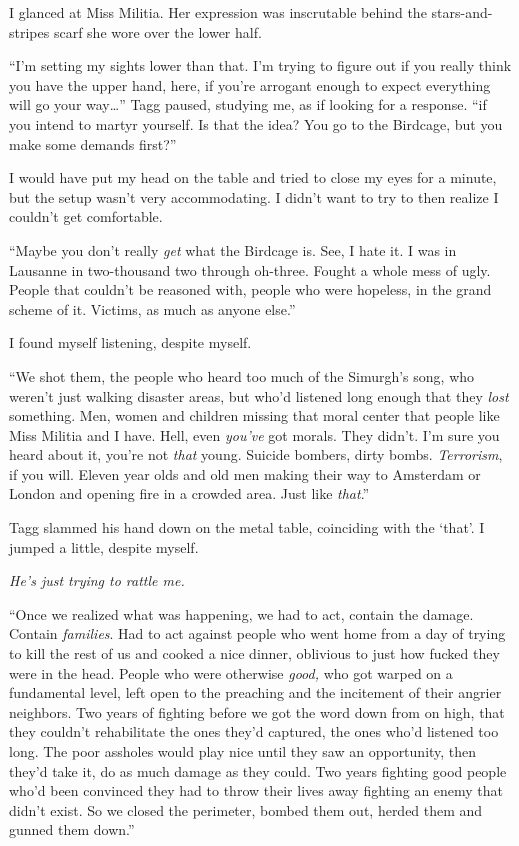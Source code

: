 I glanced at Miss Militia.  Her expression was inscrutable behind the stars-and-stripes scarf she wore over the lower half.



``I'm setting my sights lower than that.  I'm trying to figure out if you really think you have the upper hand, here, if you're arrogant enough to expect everything will go your way\ldots'' Tagg paused, studying me, as if looking for a response.  ``\ldotsor if you intend to martyr yourself.  Is that the idea?  You go to the Birdcage, but you make some demands first?''



I would have put my head on the table and tried to close my eyes for a minute, but the setup wasn't very accommodating.  I didn't want to try to then realize I couldn't get comfortable.



``Maybe you don't really \emph{get} what the Birdcage is.  See, I hate it.  I was in Lausanne in two-thousand two through oh-three.  Fought a whole mess of ugly.  People that couldn't be reasoned with, people who were hopeless, in the grand scheme of it.  Victims, as much as anyone else.''



I found myself listening, despite myself.



``We shot them, the people who heard too much of the Simurgh's song, who weren't just walking disaster areas, but who'd listened long enough that they \emph{lost} something.  Men, women and children missing that moral center that people like Miss Militia and I have.  Hell, even \emph{you've} got morals.  They didn't.  I'm sure you heard about it, you're not \emph{that} young.  Suicide bombers, dirty bombs.  \emph{Terrorism}, if you will.  Eleven year olds and old men making their way to Amsterdam or London and opening fire in a crowded area.  Just like \emph{that}.''



Tagg slammed his hand down on the metal table, coinciding with the `that'.  I jumped a little, despite myself.



\emph{He's just trying to rattle me.}



``Once we realized what was happening, we had to act, contain the damage.  Contain \emph{families}.  Had to act against people who went home from a day of trying to kill the rest of us and cooked a nice dinner, oblivious to just how fucked they were in the head.  People who were otherwise \emph{good, }who got warped on a fundamental level, left open to the preaching and the incitement of their angrier neighbors.  Two years of fighting before we got the word down from on high, that they couldn't rehabilitate the ones they'd captured, the ones who'd listened too long.  The poor assholes would play nice until they saw an opportunity, then they'd take it, do as much damage as they could.  Two years fighting good people who'd been convinced they had to throw their lives away fighting an enemy that didn't exist.  So we closed the perimeter, bombed them out, herded them and gunned them down.''




